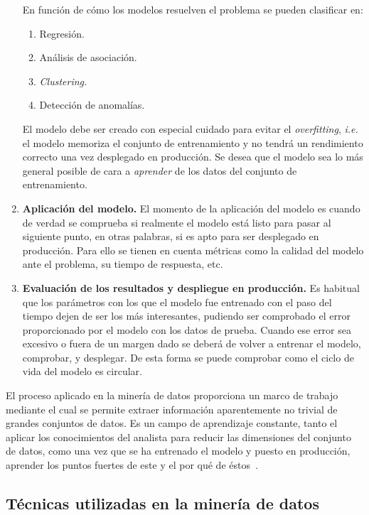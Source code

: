 \begin{enumerate}
En función de cómo los modelos resuelven el problema se pueden clasificar en:
    \begin{enumerate}
        \item Regresión.
        \item Análisis de asociación.
        \item \textit{Clustering.}
        \item Detección de anomalías.
    \end{enumerate}
    
    El modelo debe ser creado con especial cuidado para evitar el \textit{overfitting}, \textit{i.e.} el modelo memoriza el conjunto de entrenamiento y no tendrá un rendimiento correcto una vez desplegado en producción. Se desea que el modelo sea lo más general posible de cara a \textit{aprender} de los datos del conjunto de entrenamiento.

    \item \textbf{Aplicación del modelo.}
	El momento de la aplicación del modelo es cuando de verdad se comprueba si realmente el modelo está listo para pasar al siguiente punto, en otras palabras, si es apto para ser desplegado en producción. 
	Para ello se tienen en cuenta métricas como la calidad del modelo ante el problema, su tiempo de respuesta, etc.
    
	\item \textbf{Evaluación de los resultados y despliegue en producción.}
	Es habitual que los parámetros con los que el modelo fue entrenado con el paso del tiempo dejen de ser los más interesantes, pudiendo ser comprobado el error proporcionado por el modelo con los datos de prueba. Cuando ese error sea excesivo o fuera de un margen dado se deberá de volver a entrenar el modelo, comprobar, y desplegar. 
	De esta forma se puede comprobar como el ciclo de vida del modelo es circular.
\end{enumerate}

El proceso aplicado en la minería de datos proporciona un marco de trabajo mediante el cual se permite extraer información aparentemente no trivial de grandes conjuntos de datos. 
Es un campo de aprendizaje constante, tanto el aplicar los conocimientos del analista para reducir las dimensiones del conjunto de datos, como una vez que se ha entrenado el modelo y puesto en producción, aprender los puntos fuertes de este y el por qué de éstos~\cite{Chapman2000CRISPDM1S}.

\subsection{Técnicas utilizadas en la minería de datos}

